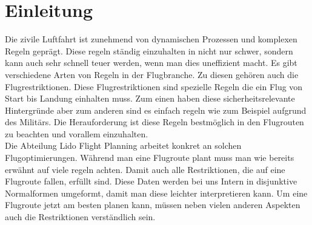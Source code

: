 \documentclass[a4paper,12pt]{article}
\begin{document}
\newpage
\tableofcontents

\newpage
{}
\setcounter{page}{1}  %
\fancyfoot[C]{\thepage}
\section{Einleitung}
Die zivile Luftfahrt ist zunehmend von dynamischen Prozessen und komplexen Regeln geprägt. Diese regeln ständig einzuhalten in nicht nur schwer, sondern kann auch sehr schnell teuer werden, wenn man dies uneffizient macht. Es gibt verschiedene Arten von Regeln in der Flugbranche. Zu diesen gehören auch die Flugrestriktionen. Diese Flugrestriktionen sind spezielle Regeln die ein Flug von Start bis Landung einhalten muss. Zum einen haben diese sicherheitsrelevante Hintergründe aber zum anderen sind es einfach regeln wie zum Beispiel aufgrund des Militärs. Die Herauforderung ist diese Regeln bestmöglich in den Flugrouten zu beachten und vorallem einzuhalten. \\
Die Abteilung Lido Flight Planning arbeitet konkret an solchen Flugoptimierungen. Während man eine Flugroute plant muss man wie bereits erwähnt auf viele regeln achten. Damit auch alle Restriktionen, die auf eine Flugroute fallen, erfüllt sind. Diese Daten werden bei uns Intern in disjunktive Normalformen umgeformt, damit man diese leichter interpretieren kann. Um eine Flugroute jetzt am besten planen kann, müssen neben vielen anderen Aspekten auch die Restriktionen verständlich sein.
\end{document}
